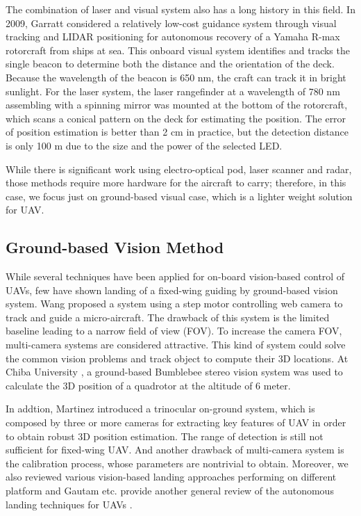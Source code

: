
The combination of laser and visual system also has a long history in this field. In 2009, Garratt \cite{garrattvisual2009} considered a relatively low-cost guidance system through visual tracking and LIDAR positioning for autonomous recovery of a Yamaha R-max rotorcraft from ships at sea. This onboard visual system identifies and tracks the single beacon to determine both the distance and the orientation of the deck. Because the wavelength of the beacon is 650 nm, the craft can track it in bright sunlight. For the laser system, the laser rangefinder at a wavelength of 780 nm assembling with a spinning mirror was mounted at the bottom of the rotorcraft, which scans a conical pattern on the deck for estimating the position. The error of position estimation is better than 2 cm in practice, but the detection distance is only 100 m due to the size and the power of the selected LED. 

While there is significant work using electro-optical pod, laser scanner and radar, those methods require more hardware for the aircraft to carry; therefore, in this case, we focus just on ground-based visual case, which is a lighter weight solution for UAV.
\subsection{Ground-based Vision Method}
While several techniques have been applied for on-board vision-based control of UAVs, few have shown landing of a fixed-wing guiding by ground-based vision system. Wang \cite{Wang2006} proposed a system using a step motor controlling web camera to track and guide a micro-aircraft. The drawback of this system is the limited baseline leading to a narrow field of view (FOV). To increase the camera FOV, multi-camera systems are considered attractive. This kind of system could solve the common vision problems and track object to compute their 3D locations. At Chiba University \cite{pebrianti2010autonomous}, a ground-based Bumblebee stereo vision system was used to calculate the 3D position of a quadrotor at the altitude of 6 meter. 

In addtion, Martinez \cite{Martinez2009a} introduced a trinocular on-ground system, which is composed by three or more cameras for extracting key features of UAV in order to obtain robust 3D position estimation. The range of detection is still not sufficient for fixed-wing UAV. And another drawback of multi-camera system is the calibration process, whose parameters are nontrivial to obtain. Moreover, we also reviewed various vision-based landing approaches performing on different platform \cite{kong2014vision} and Gautam etc. provide another general review of the autonomous landing techniques for UAVs \cite{Gautam2014}.

